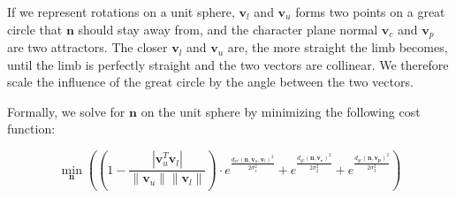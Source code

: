 If we represent rotations on a unit sphere, $\mathbf{v}_l$ and $\mathbf{v}_u$ forms two points on a great circle that $\mathbf{n}$ should stay away from, and the character plane normal $\mathbf{v}_c$ and $\mathbf{v}_p$ are two attractors. The closer $\mathbf{v}_l$ and $\mathbf{v}_u$ are, the more straight the limb becomes, until the limb is perfectly straight and the two vectors are collinear. We therefore scale the influence of the great circle by the angle between the two vectors. %
\begin{comment}
The optimization is encouraged to avoid the great circle. We also encourage the solution to remain near the root-view project plane. This ensure the twisted perspective isn't abused, and helps the resulting pose, after being applied to the character, recognizable and cohesive.
Additionally, we encourage the solution to remain close to the previous frame's projection plane, if possible.
This minimizes repeating popping in the limb when the root view projection plane remains upon the great circle.

We formulate the optimization as a modified gaussian, lowering the cost of solutions close to the root-view projection plane vector and the limb's previous projection plane vector, and increasing the cost of solutions that are close to the great circle.

We note that, when the limb is perfectly straight, both 3D bone vectors occupy the same point upon the unit sphere, and there are therefore infinitely many great circles containing both.
However, we further note that, in such a configuration, there is no `bend' in the limb that needs to preserved when applied to the character. We scale the influence of the great circle such that, as the limb becomes totally straight, it goes to zero.
\end{comment}

Formally, we solve for $\mathbf{n}$ on the unit sphere by minimizing the following cost function:

\begin{equation}
\min_{\mathbf{n}} \left( (1 - \frac{|\mathbf{v}_u^T\mathbf{v}_l|}{\|\mathbf{v}_u\|\|\mathbf{v}_l\|}) \cdot e^{\frac{d_{xt}(\mathbf{n}, \mathbf{v}_u, \mathbf{v}_l)^2}{{2 \sigma_1^2}}} + e^{\frac{d_{gc}(\mathbf{n}, \mathbf{v_c})^2}{{2 \sigma_2^2}}} + e^{\frac{{d_{gc}(\mathbf{n}, \mathbf{v_p})^2}}{{2 \sigma_3^2}}} \right)
\end{equation}

